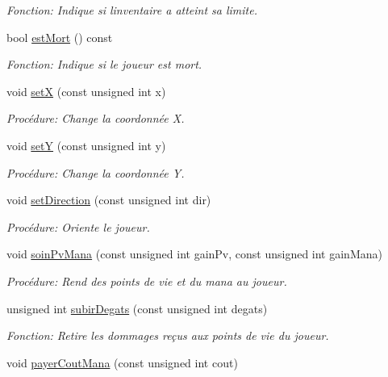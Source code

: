 \begin{DoxyCompactItemize}
\begin{DoxyCompactList}\small\item\em Fonction\+: Indique si l\textquotesingle{}inventaire a atteint sa limite. \end{DoxyCompactList}\item 
bool \mbox{\hyperlink{classJoueur_ac5858c0f47f552a3abfc1963045b02ef}{est\+Mort}} () const
\begin{DoxyCompactList}\small\item\em Fonction\+: Indique si le joueur est mort. \end{DoxyCompactList}\item 
void \mbox{\hyperlink{classJoueur_a5da6810c854b9aae11f725c8b2dffe61}{setX}} (const unsigned int x)
\begin{DoxyCompactList}\small\item\em Procédure\+: Change la coordonnée X. \end{DoxyCompactList}\item 
void \mbox{\hyperlink{classJoueur_a682f7cb2fa36f810d3e0f72f96e18696}{setY}} (const unsigned int y)
\begin{DoxyCompactList}\small\item\em Procédure\+: Change la coordonnée Y. \end{DoxyCompactList}\item 
void \mbox{\hyperlink{classJoueur_a873b075ff9fe84219a5208765022b06b}{set\+Direction}} (const unsigned int dir)
\begin{DoxyCompactList}\small\item\em Procédure\+: Oriente le joueur. \end{DoxyCompactList}\item 
void \mbox{\hyperlink{classJoueur_ace8f0a52669bf6aa9021dc3f17d1b0be}{soin\+Pv\+Mana}} (const unsigned int gain\+Pv, const unsigned int gain\+Mana)
\begin{DoxyCompactList}\small\item\em Procédure\+: Rend des points de vie et du mana au joueur. \end{DoxyCompactList}\item 
unsigned int \mbox{\hyperlink{classJoueur_a4adf0e1a3a5ac5f67fe2e23783138dad}{subir\+Degats}} (const unsigned int degats)
\begin{DoxyCompactList}\small\item\em Fonction\+: Retire les dommages reçus aux points de vie du joueur. \end{DoxyCompactList}\item 
void \mbox{\hyperlink{classJoueur_a3e461446055f364483c8315d7e611793}{payer\+Cout\+Mana}} (const unsigned int cout)

\end{DoxyCompactItemize}
